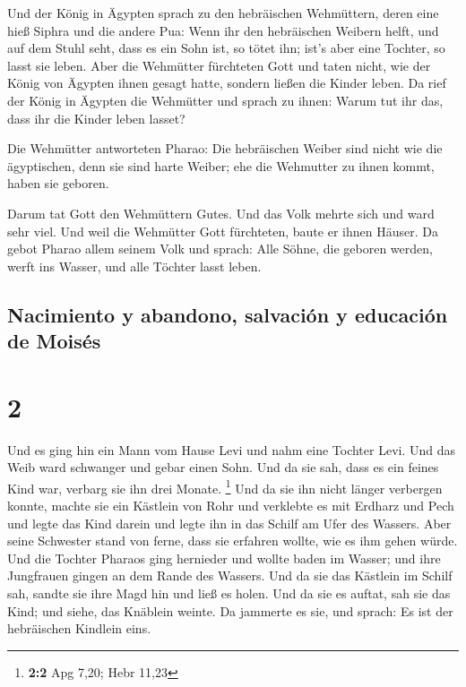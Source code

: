  Und der König in Ägypten sprach zu den hebräischen
Wehmüttern, deren eine hieß Siphra und die andere Pua: 
Wenn ihr den hebräischen Weibern helft, und auf dem Stuhl seht, dass es
ein Sohn ist, so tötet ihn; ist's aber eine Tochter, so lasst sie leben.
 Aber die Wehmütter fürchteten Gott und taten nicht, wie
der König von Ägypten ihnen gesagt hatte, sondern ließen die Kinder
leben.  Da rief der König in Ägypten die Wehmütter und
sprach zu ihnen: Warum tut ihr das, dass ihr die Kinder leben lasset?

 Die Wehmütter antworteten Pharao: Die hebräischen Weiber
sind nicht wie die ägyptischen, denn sie sind harte Weiber; ehe die
Wehmutter zu ihnen kommt, haben sie geboren.

 Darum tat Gott den Wehmüttern Gutes. Und das Volk mehrte
sich und ward sehr viel.  Und weil die Wehmütter Gott
fürchteten, baute er ihnen Häuser.  Da gebot Pharao allem
seinem Volk und sprach: Alle Söhne, die geboren werden, werft ins
Wasser, und alle Töchter lasst leben.

\hypertarget{nacimiento-y-abandono-salvaciuxf3n-y-educaciuxf3n-de-moisuxe9s}{%
\subsection{Nacimiento y abandono, salvación y educación de
Moisés}\label{nacimiento-y-abandono-salvaciuxf3n-y-educaciuxf3n-de-moisuxe9s}}

\hypertarget{section-1}{%
\section{2}\label{section-1}}

 Und es ging hin ein Mann vom Hause Levi und nahm eine
Tochter Levi.  Und das Weib ward schwanger und gebar einen
Sohn. Und da sie sah, dass es ein feines Kind war, verbarg sie ihn drei
Monate. \footnote{\textbf{2:2} Apg 7,20; Hebr 11,23}  Und
da sie ihn nicht länger verbergen konnte, machte sie ein Kästlein von
Rohr und verklebte es mit Erdharz und Pech und legte das Kind darein und
legte ihn in das Schilf am Ufer des Wassers.  Aber seine
Schwester stand von ferne, dass sie erfahren wollte, wie es ihm gehen
würde.  Und die Tochter Pharaos ging hernieder und wollte
baden im Wasser; und ihre Jungfrauen gingen an dem Rande des Wassers.
Und da sie das Kästlein im Schilf sah, sandte sie ihre Magd hin und ließ
es holen.  Und da sie es auftat, sah sie das Kind; und
siehe, das Knäblein weinte. Da jammerte es sie, und sprach: Es ist der
hebräischen Kindlein eins.


